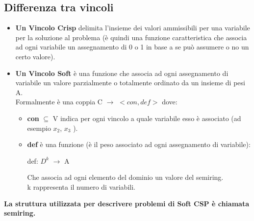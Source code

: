 \subsection{Differenza tra vincoli}
\begin{itemize}
    \item \textbf{Un Vincolo Crisp} delimita l'insieme dei valori ammissibili per una variabile per la soluzione al problema (è quindi una funzione caratteristica che associa ad ogni variabile un assegnamento di 0 o 1 in base a se può assumere o no un certo valore).
    \item \textbf{Un Vincolo Soft} è una funzione che associa ad ogni assegnamento di variabile un valore parzialmente o totalmente ordinato da un insieme di pesi A.
          \\Formalmente è una coppia C $\rightarrow$ $<con, def>$ dove:

          \begin{itemize}
              \item \textbf{con} $\subseteq$ V indica per ogni vincolo a quale variabile esso è associato (ad esempio $x_2 $, $x_3$ ).
              \item \textbf{def} è una funzione (è il peso associato ad ogni assegnamento di variabile):
                    \begin{center}
                        def: $D^k$ $\rightarrow$ A

                        Che associa ad ogni elemento del dominio un valore del semiring.
                        \\k rappresenta il numero di variabili.
                    \end{center}
          \end{itemize}
\end{itemize}
\textbf{La struttura utilizzata per descrivere problemi di Soft CSP è chiamata semiring.}

